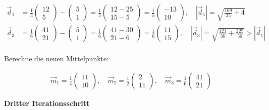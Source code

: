 \documentclass[11pt]{article}
\begin{document}
\[\begin{aligned}
\vec{d}_1 &= \frac{1}{5}\begin{pmatrix} 12 \\ 5 \end{pmatrix} -  \begin{pmatrix} 5 \\ 1 \end{pmatrix} =  \frac{1}{5} \begin{pmatrix} 12 -25 \\ 15 - 5  \end{pmatrix} = \frac{1}{5}\begin{pmatrix} -13 \\ 10 \end{pmatrix}, \quad \left| \vec{d}_1 \right| = \sqrt{\frac{169}{25} + 4}  \\
\vec{d}_3 &= \frac{1}{6}\begin{pmatrix} 41 \\ 21 \end{pmatrix} -  \begin{pmatrix} 5 \\ 1 \end{pmatrix} =  \frac{1}{6} \begin{pmatrix} 41 -30 \\ 21 -6  \end{pmatrix} = \frac{1}{6}\begin{pmatrix} 11 \\ 15 \end{pmatrix}, \quad \left| \vec{d}_3 \right| = \sqrt{\frac{121}{36} + \frac{225}{36}} >  \left| \vec{d}_1 \right|  \\
\end{aligned}\]

Berechne die neuen Mittelpunkte:

\[ \begin{aligned}
\vec{m}_1 = \frac{1}{4} \begin{pmatrix} 11 \\ 10\end{pmatrix}, \quad 
\vec{m}_2 = \frac{1}{2} \begin{pmatrix} 2 \\ 11 \end{pmatrix}, \quad 
\vec{m}_3 = \frac{1}{6} \begin{pmatrix} 41 \\ 21 \end{pmatrix} 
\end{aligned} \]

\textbf{Dritter Iterationsschritt}
\end{document}
